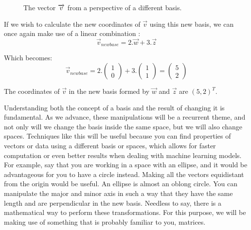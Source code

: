 \documentclass[a4,12pt,twosided,openany]{memoir}
\begin{document}
\begin{figure}[h!]
\begin{center}
\end{center}
\vspace*{3pt}
\caption{The vector $\protect\overrightarrow{v}$ from a perspective of a different basis.}
\end{figure}
\par 
\indent
If we wish to calculate the new coordinates of $\overrightarrow{v}$ using this new basis, we can once again make use of a linear combination :
\[ \overrightarrow{v}_{new base} = 2.\overrightarrow{w}+ 3.\overrightarrow{z} \]
\par 
\indent
Which becomes:
\[ \overrightarrow{v}_{new base} = 2.\begin{pmatrix}
 1 \\
 0
 \end{pmatrix} + 3.\begin{pmatrix}
 1 \\
 1
 \end{pmatrix} = \begin{pmatrix}
 5 \\
 2
 \end{pmatrix} \]
 \par 
\indent
The coordinates of $\overrightarrow{v}$ in the new basis formed by $\overrightarrow{w}$ and $\overrightarrow{z}$ are $(5,2)^T$.
\par 
\indent
Understanding both the concept of a basis and the result of changing it is fundamental. As we advance, these manipulations will be a recurrent theme, and not only will we change the basis inside the same space, but we will also change spaces. Techniques like this will be useful because you can find properties of vectors or data using a different basis or spaces, which allows for faster computation or even better results when dealing with machine learning models. For example, say that you are working in a space with an ellipse, and it would be advantageous for you to have a circle instead. Making all the vectors equidistant from the origin would be useful. An ellipse is almost an oblong circle. You can manipulate the major and minor axis in such a way that they have the same length and are perpendicular in the new basis. Needless to say, there is a mathematical way to perform these transformations. For this purpose, we will be making use of something that is probably familiar to you, matrices.
\end{document}
